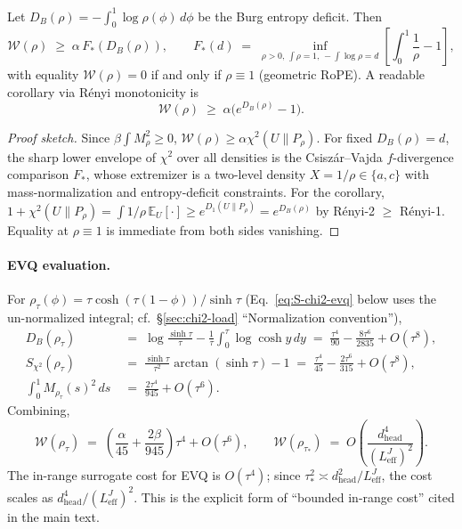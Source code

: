 \begin{proposition}
\label{prop:waterbed}
Let $D_B(\rho) = -\int_0^1\log\rho(\phi)\,d\phi$ be the Burg entropy deficit. Then
\begin{equation}
\mathcal{W}(\rho) \;\ge\; \alpha\,F_{*}(D_B(\rho)),\qquad F_{*}(d) \;=\; \inf_{\rho>0,\,\int\rho=1,\,-\int\log\rho=d}\left[\int_0^1\frac{1}{\rho}-1\right],
\label{eq:waterbed-tight}
\end{equation}
with equality $\mathcal{W}(\rho) = 0$ if and only if $\rho \equiv 1$ (geometric RoPE). A readable corollary via R\'enyi monotonicity is
\begin{equation}
\mathcal{W}(\rho) \;\ge\; \alpha\bigl(e^{D_B(\rho)} - 1\bigr).
\label{eq:waterbed-corollary}
\end{equation}
\end{proposition}

\begin{proof}[Proof sketch]
Since $\beta\int M_\rho^2\ge 0$, $\mathcal{W}(\rho)\ge\alpha\chi^2(U\|P_\rho)$. For fixed $D_B(\rho){=}d$, the sharp lower envelope of $\chi^2$ over all densities is the Csisz\'ar--Vajda $f$-divergence comparison $F_{*}$, whose extremizer is a two-level density $X=1/\rho\in\{a,c\}$ with mass-normalization and entropy-deficit constraints. For the corollary, $1+\chi^2(U\|P_\rho) = \int 1/\rho\,\mathbb{E}_{U}[\cdot] \ge e^{D_1(U\|P_\rho)} = e^{D_B(\rho)}$ by R\'enyi-2 $\ge$ R\'enyi-1. Equality at $\rho{\equiv}1$ is immediate from both sides vanishing.
\end{proof}

\paragraph{EVQ evaluation.} For $\rho_\tau(\phi) = \tau\cosh(\tau(1{-}\phi))/\sinh\tau$ (Eq.~\eqref{eq:S-chi2-evq} below uses the un-normalized integral; cf.\ \S\ref{sec:chi2-load} ``Normalization convention''),
\begin{align}
D_B(\rho_\tau) \;&=\; \log\tfrac{\sinh\tau}{\tau} - \tfrac{1}{\tau}\int_0^\tau\log\cosh y\,dy \;=\; \tfrac{\tau^4}{90} - \tfrac{8\tau^6}{2835} + O(\tau^8),\label{eq:D-B-evq}\\
S_{\chi^2}(\rho_\tau) \;&=\; \tfrac{\sinh\tau}{\tau^2}\arctan(\sinh\tau) - 1 \;=\; \tfrac{\tau^4}{45} - \tfrac{2\tau^6}{315} + O(\tau^8),\label{eq:S-chi2-evq}\\
\int_0^1 M_{\rho_\tau}(s)^2\,ds \;&=\; \tfrac{2\tau^4}{945} + O(\tau^6).\label{eq:M-rho-evq}
\end{align}
Combining,
\begin{equation}
\mathcal{W}(\rho_\tau) \;=\; \left(\frac{\alpha}{45}+\frac{2\beta}{945}\right)\tau^4 + O(\tau^6),\qquad \mathcal{W}(\rho_{\tau_*}) \;=\; O\!\left(\frac{d_{\mathrm{head}}^4}{(L_{\mathrm{eff}}^{J})^2}\right).
\label{eq:waterbed-evq-scale}
\end{equation}
The in-range surrogate cost for EVQ is $O(\tau^4)$; since $\tau_*^2 \asymp d_{\mathrm{head}}^2/L_{\mathrm{eff}}^{J}$, the cost scales as $d_{\mathrm{head}}^4/(L_{\mathrm{eff}}^{J})^2$. This is the explicit form of ``bounded in-range cost'' cited in the main text.

